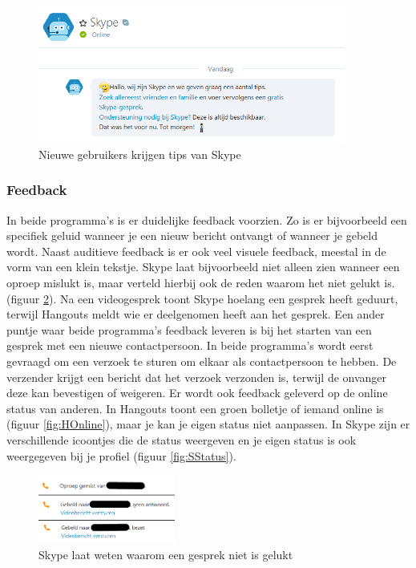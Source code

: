 \documentclass[11pt]{article}
\begin{document}
\begin{figure}
	\centering
	\includegraphics[width=0.9\textwidth]{Dylan_STips.png}
	\caption{Nieuwe gebruikers krijgen tips van Skype}
	\label{fig:STips}
\end{figure}
\subsubsection{Feedback}
In beide programma's is er duidelijke feedback voorzien. Zo is er bijvoorbeeld een specifiek geluid wanneer je een nieuw bericht ontvangt of wanneer je gebeld wordt. Naast auditieve feedback is er ook veel visuele feedback, meestal in de vorm van een klein tekstje. Skype laat bijvoorbeeld niet alleen zien wanneer een oproep mislukt is, maar verteld hierbij ook de reden waarom het niet gelukt is. (figuur \ref{fig:SFeedbackGesprek}). Na een videogesprek toont Skype hoelang een gesprek heeft geduurt, terwijl Hangouts meldt wie er deelgenomen heeft aan het gesprek. Een ander puntje waar beide programma's feedback leveren is bij het starten van een gesprek met een nieuwe contactpersoon. In beide programma's wordt eerst gevraagd om een verzoek te sturen om elkaar als contactpersoon te hebben. De verzender krijgt een bericht dat het verzoek verzonden is, terwijl de onvanger deze kan bevestigen of weigeren. Er wordt ook feedback geleverd op de online status van anderen. In Hangouts toont een groen bolletje of iemand online is (figuur \ref{fig:HOnline}), maar je kan je eigen status niet aanpassen. In Skype zijn er verschillende icoontjes die de status weergeven en je eigen status is ook weergegeven bij je profiel (figuur \ref{fig:SStatus}).
\begin{figure}
	\centering
	\includegraphics[width=0.4\textwidth]{Dylan_SFeedbackGesprek.png}
	\caption{Skype laat weten waarom een gesprek niet is gelukt}
	\label{fig:SFeedbackGesprek}
\end{figure}
\end{document}
